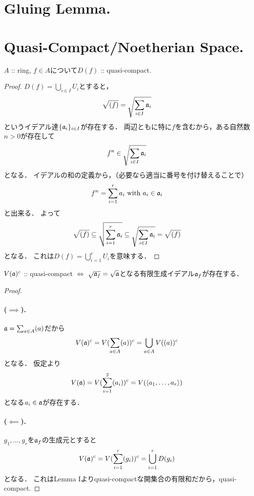 \documentclass[a4paper]{jsarticle}
\begin{document}
\section{Gluing Lemma.} %

\section{Quasi-Compact/Noetherian Space.} %
    \begin{Lemma}[I]
        $A$ :: ring, $f \in A$について$D(f)$ :: quasi-compact.
    \end{Lemma}
    \begin{proof}
        $D(f)=\bigcup_{i \in I} U_i$とすると，
        \[ \sqrt{(f)}=\sqrt{\sum_{i \in I} \mathfrak{a}_i} \]
        というイデアル達$\{\mathfrak{a}_i\}_{i \in I}$が存在する．
        両辺ともに特に$f$を含むから，ある自然数$n>0$が存在して
        \[ f^n \in \sqrt{\sum_{i \in I} \mathfrak{a}_i} \]
        となる．
        イデアルの和の定義から，（必要なら適当に番号を付け替えることで）
        \[ f^n=\sum_{i=1}^{r} a_i \text{ with } a_i \in \mathfrak{a}_i \]
        と出来る．
        よって
        \[
            \sqrt{(f)}
            \subseteq \sqrt{\sum_{i=1}^{r} \mathfrak{a}_i}
            \subseteq \sqrt{\sum_{i \in I} \mathfrak{a}_i}=\sqrt{(f)}
        \]
        となる．
        これは$D(f)=\bigcup_{i=1}^r U_i$を意味する．
    \end{proof}
    \begin{Lemma}[II]
        $V(\mathfrak{a})^c$ :: quasi-compact
        $\iff$
        $\sqrt{\mathfrak{a}_f}=\sqrt{\mathfrak{a}}$となる有限生成イデアル$\mathfrak{a}_f$が存在する．
    \end{Lemma}
    \begin{proof}
        \paragraph{($\implies$).}
        $\mathfrak{a}=\sum_{a \in A} (a)$だから
        \[ V(\mathfrak{a})^c=V(\sum_{a \in A} (a))^c=\bigcup_{a \in A} V((a))^c \]となる．
        仮定より
        \[ V(\mathfrak{a})=V(\sum_{i=1}^2 (a_i))^c=V(\langle a_1,\dots,a_r\rangle) \]
        となる$a_i \in \mathfrak{a}$が存在する．

        \paragraph{($\impliedby$).}
        $g_1,\dots,g_r$を$\mathfrak{a}_f$の生成元とすると
        \[ V(\mathfrak{a})^c=V(\sum_{i=1}^r (g_i))^c=\bigcup_{i=1}^r D(g_i) \]となる．
        これはLemma Iよりquasi-compactな開集合の有限和だから，quasi-compact.
    \end{proof}
\end{document}
